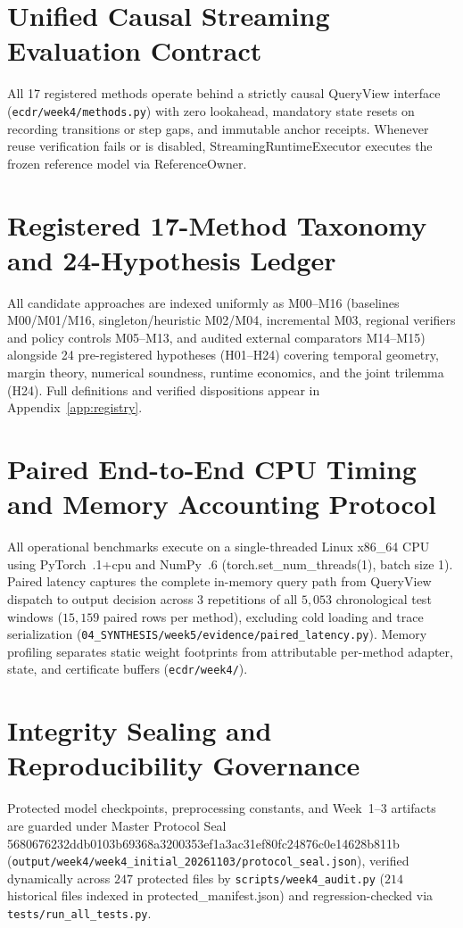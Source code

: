 \documentclass[11pt,oneside,a4paper]{report}
\newcommand{\code}[1]{{\small\upshape\ttfamily #1}}
\theoremstyle{remark}
\begin{document}
\section{Unified Causal Streaming Evaluation Contract}
All 17 registered methods operate behind a strictly causal \code{QueryView} interface (\nolinkurl{ecdr/week4/methods.py}) with zero lookahead, mandatory state resets on recording transitions or step gaps, and immutable anchor receipts. Whenever reuse verification fails or is disabled, \code{StreamingRuntimeExecutor} executes the frozen reference model via \code{ReferenceOwner}.

\section{Registered 17-Method Taxonomy and 24-Hypothesis Ledger}
All candidate approaches are indexed uniformly as \code{M00}--\code{M16} (baselines \code{M00}/\code{M01}/\code{M16}, singleton/heuristic \code{M02}/\code{M04}, incremental \code{M03}, regional verifiers and policy controls \code{M05}--\code{M13}, and audited external comparators \code{M14}--\code{M15}) alongside 24 pre-registered hypotheses (\code{H01}--\code{H24}) covering temporal geometry, margin theory, numerical soundness, runtime economics, and the joint trilemma (\code{H24}). Full definitions and verified dispositions appear in Appendix~\ref{app:registry}.

\section{Paired End-to-End CPU Timing and Memory Accounting Protocol}
All operational benchmarks execute on a single-threaded Linux x86\_64 CPU using PyTorch~\code{2.14.1+cpu} and NumPy~\code{2.4.6} (\code{torch.set\_num\_threads(1)}, batch size 1). Paired latency captures the complete in-memory query path from \code{QueryView} dispatch to output decision across $3$ repetitions of all $5,053$ chronological test windows ($15,159$ paired rows per method), excluding cold loading and trace serialization (\nolinkurl{04_SYNTHESIS/week5/evidence/paired_latency.py}). Memory profiling separates static weight footprints from attributable per-method adapter, state, and certificate buffers (\nolinkurl{ecdr/week4/}).

\section{Integrity Sealing and Reproducibility Governance}
Protected model checkpoints, preprocessing constants, and Week~1--3 artifacts are guarded under Master Protocol Seal \code{5680676232ddb0103b69368a3200353ef1a3ac31ef80fc24876c0e14628b811b} (\nolinkurl{output/week4/week4_initial_20261103/protocol_seal.json}), verified dynamically across $247$ protected files by \nolinkurl{scripts/week4_audit.py} ($214$ historical files indexed in \code{protected\_manifest.json}) and regression-checked via \nolinkurl{tests/run_all_tests.py}.
\end{document}
